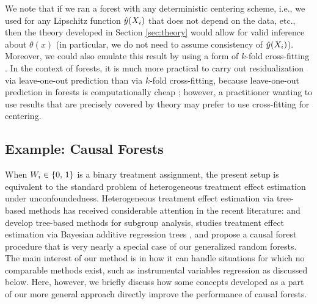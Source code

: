 \documentclass[aos]{imsart}
\theoremstyle{plain}
\theoremstyle{definition}
\theoremstyle{remark}
\begin{document}
\begin{CJK}{UTF8}{gbsn}
We note that if we ran a forest with any deterministic
centering scheme, i.e., we used  for any Lipschitz function $\hat{y}(X_i)$
that does not depend on the data, etc., then the theory developed in Section \ref{sec:theory}
would allow for valid inference about $\theta(x)$ (in particular, we do not need to
assume consistency of $\hat{y}(X_i)$). Moreover, we could also emulate this result by using a form of $k$-fold
cross-fitting \citep{chernozhukov2016double,schick1986asymptotically}.
In the context of forests, it is much more practical to carry out residualization
via leave-one-out prediction than via $k$-fold cross-fitting, because
leave-one-out prediction in forests is computationally cheap \citep{breiman2001random};
however, a practitioner wanting to use results that are precisely covered by theory may prefer
to use cross-fitting for centering.

\subsection{Example: Causal Forests}
\label{sec:cf}

When $W_i \in \left\{0, \, 1\right\}$ is a binary treatment assignment,
the present setup is equivalent to the standard problem of heterogeneous
treatment effect estimation under unconfoundedness.
Heterogeneous treatment effect estimation via tree-based methods has received considerable
attention in the recent literature: \citet{athey2016recursive} and \citet{su2009subgroup}
develop tree-based methods for subgroup analysis, \citet{hill2011bayesian}
studies treatment effect estimation via Bayesian additive regression trees
\citep{chipman2010bart}, and \citet{wager2015estimation} propose a causal forest
procedure that is very nearly a special case of our generalized random forests.
The main interest of our method is in how it can handle situations for which no
comparable methods exist, such as instrumental variables regression as discussed below.
Here, however, we briefly discuss how some concepts developed as a part of our more
general approach directly improve the performance of causal forests.


\end{CJK}
\end{document}

